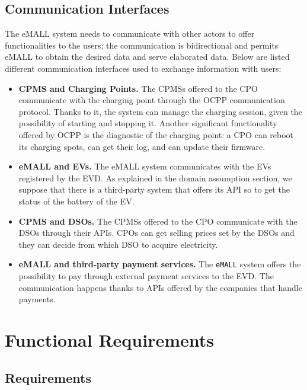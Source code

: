\subsection{Communication Interfaces}
\label{subsec:communication_interfaces}%
The eMALL system needs to communicate with other actors to offer functionalities to the users;
the communication is bidirectional and permits eMALL to obtain the desired data and serve elaborated data.
Below are listed different communication interfaces used to exchange information with users:
\begin{itemize}
    \item \textbf{CPMS and Charging Points.} The CPMSs offered to the CPO communicate with the charging point
    through the OCPP communication protocol.
    Thanks to it, the system can manage the charging session, given the possibility of starting and stopping it.
    Another significant functionality offered by OCPP is the diagnostic of the charging point:
    a CPO can reboot its charging spots, can get their log, and can update their firmware.
    \item \textbf{eMALL and EVs.} The eMALL system communicates with the EVs registered by the EVD\@.
    As explained in the domain assumption section, we suppose that there is a third-party system that offers its API
    so to get the status of the battery of the EV. %
    \item \textbf{CPMS and DSOs.} The CPMSs offered to the CPO communicate with the DSOs through their APIs.
    CPOs can get selling prices set by the DSOs and they can decide from which DSO to acquire electricity.
    \item \textbf{eMALL and third-party payment services.} The \verb|eMALL| system offers the possibility to pay through
    external payment services to the EVD. The communication happens thanks to APIs offered by the companies that handle payments.
\end{itemize}


\section{Functional Requirements}
\label{sec:functional_requirements}%

\subsection{Requirements}
\label{subsec: requirements}%

